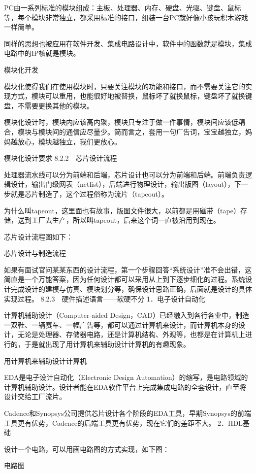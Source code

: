 \documentclass[12pt,UTF8]{ctexbook}
\begin{document}
PC由一系列标准的模块组成：主板、处理器、内存、硬盘、光驱、键盘、鼠标等，每个模块非常独立，都采用标准的接口，组装一台PC就好像小孩玩积木游戏一样简单。

同样的思想也被应用在软件开发、集成电路设计中，软件中的函数就是模块，集成电路中的IP核就是模块。

模块化开发

模块化使得我们在使用模块时，只要关注模块的功能和接口，而不需要关注它的实现方式，模块可以重用，也能很好地被替换，鼠标坏了就换鼠标，键盘坏了就换键盘，不需要更换其他的模块。

模块化设计时，模块内应该高内聚，模块只专注于做一件事情，模块间应该低耦合，模块与模块间的通信应尽量少。简而言之，套用一句广告词，宝宝越独立，妈妈越放心，模块越独立，我们更放心。

模块化设计要求
8.2.2　芯片设计流程

处理器流水线可以分为前端和后端，芯片设计也可以分为前端和后端。前端负责逻辑设计，输出门级网表（netlist），后端进行物理设计，输出版图（layout），下一步就是芯片制造了，这个过程俗称为流片（tapeout）。

为什么叫tapeout，这里面也有故事，版图文件很大，以前都是用磁带（tape）存储，送到工厂去生产，所以叫tapeout，后来这个词一直被沿用到现在。

芯片设计流程图如下：

芯片设计与制造流程

如果有面试官问某某东西的设计流程，第一个步骤回答“系统设计”准不会出错，这简直是一个万能答案，因为任何设计都可以采用从上到下逐步细化的过程。系统设计完成设计的建模与仿真、模块划分等，确保设计思路正确，后面就是设计的具体实现过程。
8.2.3　硬件描述语言——软硬不分
1．电子设计自动化

计算机辅助设计（Computer-aided Design，CAD）已经融入到各行各业中，制造一双鞋、一辆赛车、一幅广告等，都可以通过计算机来设计，而计算机本身的设计，无论是处理器、存储器电路，还是计算机结构、外观等，也都是在计算机上进行的，于是就出现了用计算机来辅助设计计算机的有趣现象。

用计算机来辅助设计计算机

EDA是电子设计自动化（Electronic Design Automation）的缩写，是电路领域的计算机辅助设计。设计者能在EDA软件平台上完成集成电路的全套设计，直至将设计交给工厂流片。

Cadence和Synopsys公司提供芯片设计各个阶段的EDA工具，早期Synopsys的前端工具更有优势，Cadence的后端工具更有优势，现在它们的差距不大。
2．HDL基础

设计一个电路，可以用画电路图的方式实现，如下图：

电路图
\end{document}
